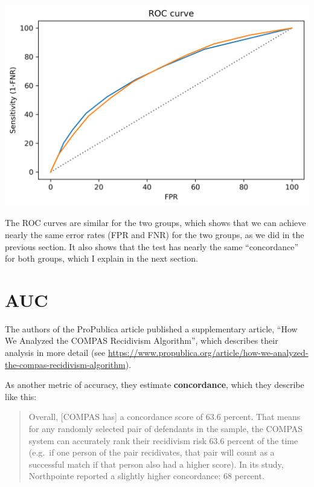 \begin{center}
\includegraphics[scale=0.75]{02_calibration_files/02_calibration_66_0.png}
\end{center}

The ROC curves are similar for the two groups, which shows that we can
achieve nearly the same error rates (FPR and FNR) for the two groups, as
we did in the previous section. It also shows that the test has nearly
the same ``concordance'' for both groups, which I explain in the next
section.

\hypertarget{auc}{%
\section{AUC}\label{auc}}

The authors of the ProPublica article published a supplementary article,
``How We Analyzed the COMPAS Recidivism Algorithm'', which describes
their analysis in more detail (see
\url{https://www.propublica.org/article/how-we-analyzed-the-compas-recidivism-algorithm}).

As another metric of accuracy, they estimate \textbf{concordance}, which
they describe like this:

\begin{quote}
Overall, {[}COMPAS has{]} a concordance score of 63.6 percent. That
means for any randomly selected pair of defendants in the sample, the
COMPAS system can accurately rank their recidivism risk 63.6 percent of
the time (e.g.~if one person of the pair recidivates, that pair will
count as a successful match if that person also had a higher score). In
its study, Northpointe reported a slightly higher concordance: 68
percent.
\end{quote}

